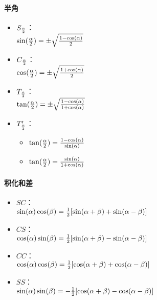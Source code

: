 \documentclass[
]{article}
\begin{document}
\hypertarget{ux534aux89d2}{%
\paragraph{半角}\label{ux534aux89d2}}

\begin{itemize}
\item
  \(S_{\alpha \over 2}\)：\\
  \(\sin({\alpha \over 2}) = \pm \sqrt{{1 - \cos(\alpha)} \over 2}\)
\item
  \(C_{\alpha \over 2}\)：\\
  \(\cos({\alpha \over 2}) = \pm \sqrt{{1 + \cos(\alpha)} \over 2}\)
\item
  \(T_{\alpha \over 2}\)：\\
  \(\tan({\alpha \over 2}) = \pm \sqrt{{1 - \cos(\alpha)} \over {1 + \cos(\alpha)}}\)
\item
  \(T_{\alpha \over 2}^\prime\)：

  \begin{itemize}
  \item
    \(\tan({\alpha \over 2}) = {{1 - \cos(\alpha)} \over \sin(\alpha)}\)
  \item
    \(\tan({\alpha \over 2}) = {\sin(\alpha) \over {1 + \cos(\alpha)}}\)
  \end{itemize}
\end{itemize}

\hypertarget{ux79efux5316ux548cux5dee}{%
\paragraph{积化和差}\label{ux79efux5316ux548cux5dee}}

\begin{itemize}
\item
  \(SC\)：\\
  \(\sin(\alpha)\cos(\beta)={1 \over 2}[\sin(\alpha + \beta) + \sin(\alpha - \beta)]\)
\item
  \(CS\)：\\
  \(\cos(\alpha)\sin(\beta)={1 \over 2}[\sin(\alpha + \beta) - \sin(\alpha - \beta)]\)
\item
  \(CC\)：\\
  \(\cos(\alpha)\cos(\beta)={1 \over 2}[\cos(\alpha + \beta) + \cos(\alpha - \beta)]\)
\item
  \(SS\)：\\
  \(\sin(\alpha)\sin(\beta)=-{1 \over 2}[\cos(\alpha + \beta) - \cos(\alpha - \beta)]\)
\end{itemize}
\end{document}
